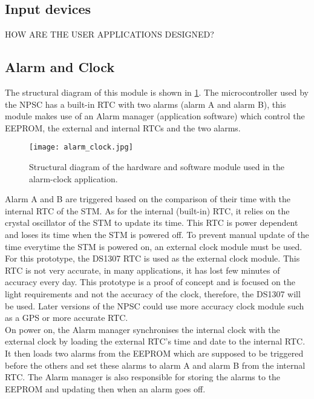 \subsection{Input devices}
HOW ARE THE USER APPLICATIONS DESIGNED?

\subsection{Alarm and Clock}
The structural diagram of this module is shown in \cref{fig:alarm_clock}. The microcontroller used by the NPSC has a built-in RTC with two alarms (alarm A and alarm B), this module makes use of an Alarm manager (application software) which control the EEPROM, the external and internal RTCs and the two alarms.
\begin{figure}[ht]
\centering
\texttt{[image: alarm\_clock.jpg]}
\caption{Structural diagram of the hardware and software module used in the alarm-clock application.}
\label{fig:alarm_clock}
\end{figure}
Alarm A and B are triggered based on the comparison of their time with the internal RTC of the STM. As for the internal (built-in) RTC, it relies on the crystal oscillator of the STM to update its time. This RTC is power dependent and loses its time when the STM is powered off. To prevent manual update of the time everytime the STM is powered on, an external clock module must be used. For this prototype, the DS1307 RTC is used as the external clock module. This RTC is not very accurate, in many applications, it has lost few minutes of accuracy every day. This prototype is a proof of concept and is focused on the light requirements and not the accuracy of the clock, therefore, the DS1307 will be used. Later versions of the NPSC could use more accuracy clock module such as a GPS or more accurate RTC.  \\
On power on, the Alarm manager synchronises the internal clock with the external clock by loading the external RTC's time and date to the internal RTC. It then loads two alarms from the EEPROM which are supposed to be triggered before the others and set these alarms to alarm A and alarm B from the internal RTC. The Alarm manager is also responsible for storing the alarms to the EEPROM and updating then when an alarm goes off. 

